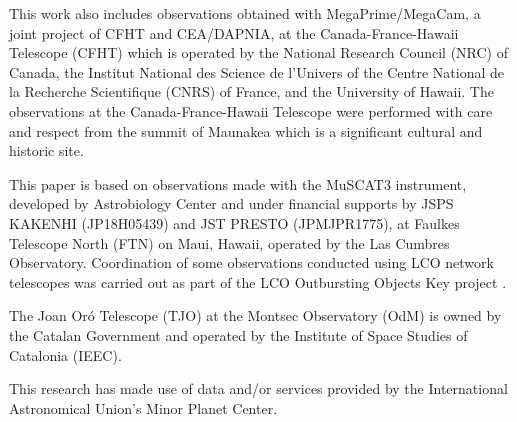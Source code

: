 \documentclass[linenumbers,twocolumn,longbib]{aastex7}
\begin{document}
\begin{acknowledgments}
This work also includes observations obtained with MegaPrime/MegaCam, a joint project of CFHT and CEA/DAPNIA, at the Canada-France-Hawaii Telescope (CFHT) which is operated by the National Research Council (NRC) of Canada, the Institut National des Science de l'Univers of the Centre National de la Recherche Scientifique (CNRS) of France, and the University of Hawaii. The observations at the Canada-France-Hawaii Telescope were performed with care and respect from the summit of Maunakea which is a significant cultural and historic site.

This paper is based on observations made with the MuSCAT3 instrument, developed by Astrobiology Center and under financial supports by JSPS KAKENHI (JP18H05439) and JST PRESTO (JPMJPR1775), at Faulkes Telescope North (FTN) on Maui, Hawaii, operated by the Las Cumbres Observatory.  Coordination of some observations conducted using LCO network telescopes was carried out as part of the LCO Outbursting Objects Key project \citep[LOOK;][]{lister2022_look}.

The Joan Or\'{o} Telescope (TJO) at the Montsec Observatory (OdM) is owned by the Catalan Government and operated by the Institute of Space Studies of Catalonia (IEEC).

This research has made use of data and/or services provided by the International Astronomical Union's Minor Planet Center.

\end{acknowledgments}
\end{document}
